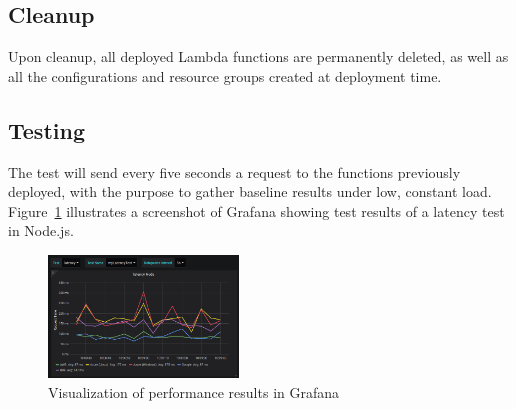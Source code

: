 \subsection{Cleanup}
Upon cleanup, all deployed Lambda functions are permanently deleted, as well as all the configurations and resource groups created at deployment time. %

\subsection{Testing}
The test will send every five seconds a request to the functions previously deployed, with the purpose to gather baseline results under low, constant load. %
Figure~\ref{fig:grafana} illustrates a screenshot of Grafana showing test results of a latency test in Node.js. 

\begin{figure}[!t]
\begin{center}
\includegraphics[width=0.45\textwidth]{bilder/grafana.png}
\captionsetup{justification=centering, labelfont=bf}
\caption{Visualization of performance results in Grafana}
\label{fig:grafana}
\end{center}
\end{figure}



